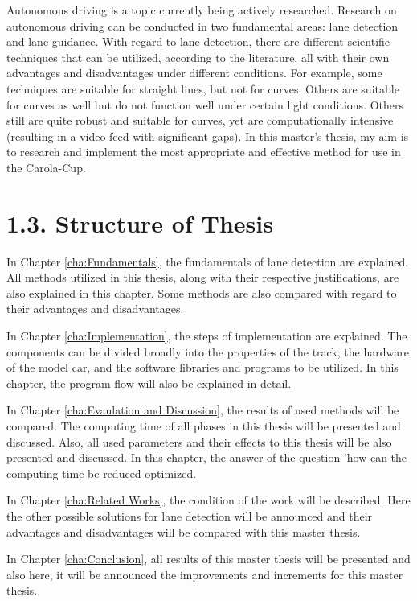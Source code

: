 Autonomous driving is a topic currently being actively researched. Research on 
autonomous driving can be conducted in two fundamental areas: lane detection and lane 
guidance. With regard to lane detection, there are different scientific techniques that 
can be utilized, according to the literature, all with their own advantages and 
disadvantages under different conditions. For example, some techniques are suitable for 
straight lines, but not for curves. Others are suitable for curves as well but do not 
function well under certain light conditions. Others still are quite robust and 
suitable for curves, yet are computationally intensive (resulting in a video feed with 
significant gaps). In this master's thesis, my aim is to research and implement the 
most appropriate and effective method for use in the Carola-Cup.



\section*{1.3. Structure of Thesis}
\label{sec:Structure of Paper}

In Chapter \ref{cha:Fundamentals}, the fundamentals of lane detection are explained. All 
methods utilized in this thesis, along with their respective justifications, are also 
explained in this chapter. Some methods are also compared with regard to their 
advantages and disadvantages.


In Chapter \ref{cha:Implementation}, the steps of implementation are explained. The 
components can be divided broadly into the properties of the track, the hardware of the 
model car, and the software libraries and programs to be utilized. In this chapter, the 
program flow will also be explained in detail.

In Chapter \ref{cha:Evaulation and Discussion}, the results of used methods will be 
compared. The computing time of all phases in this thesis will be presented and discussed. 
Also, all used parameters and their effects to this thesis will be also presented and 
discussed. In this chapter, the answer of the question 'how can the computing time be reduced 
optimized.

In Chapter \ref{cha:Related Works}, the condition of the work will be described. Here the other 
possible solutions for lane detection will be announced and their advantages and disadvantages
will be compared with this master thesis.

In Chapter \ref{cha:Conclusion}, all results of this master thesis will be presented and also here, 
it will be announced the improvements and increments for this master thesis.


